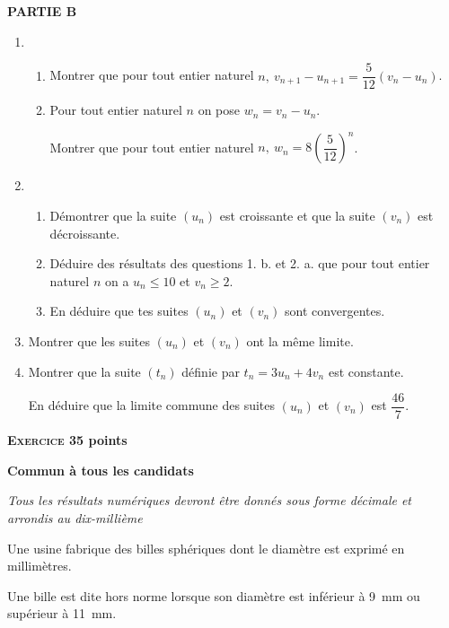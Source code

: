 \documentclass[10pt]{article}
\begin{document}
\textbf{PARTIE  B}

\medskip
 
\begin{enumerate}
\item 
	\begin{enumerate}
		\item Montrer que pour tout entier naturel $n,\: v_{n+1} - u_{n+1} = \dfrac{5}{12} \left(v_{n} - u_{n}\right)$. 
		\item Pour tout entier naturel $n$ on pose $w_{n} = v_{n} - u_{n}$.
		 
Montrer que pour tout entier naturel $n,\: w_{n} = 8 \left(\dfrac{5}{12} \right)^n$.
	\end{enumerate} 
\item 
	\begin{enumerate}
		\item Démontrer que la suite $\left(u_{n}\right)$ est croissante et que la suite $\left(v_{n}\right)$ est décroissante. 
		\item Déduire des résultats des questions 1. b. et 2. a. que pour tout entier naturel $n$ on a $u_{n} \leqslant 10$ et $v_{n} \geqslant 2$. 
		\item En déduire que tes suites $\left(u_{n}\right)$ et $\left(v_{n}\right)$ sont convergentes.
	\end{enumerate} 
\item Montrer que les suites $\left(u_{n}\right)$ et $\left(v_{n}\right)$ ont la même limite. 
\item Montrer que la suite $\left(t_{n}\right)$ définie par $t_{n} = 3u_{n} + 4v_{n}$ est constante. 

En déduire que la limite  commune des suites $\left(u_{n}\right)$ et $\left(v_{n}\right)$ est $\dfrac{46}{7}$. 
\end{enumerate}

\vspace{0,5cm}

\textbf{\textsc{Exercice 3}\hfill 5 points}

\textbf{Commun à tous les candidats}

\medskip
 
\emph{Tous les résultats numériques devront être donnés sous forme décimale et arrondis au dix-millième} 

\medskip

Une usine fabrique des billes sphériques dont le diamètre est exprimé en millimètres.
 
Une bille est dite hors norme lorsque son diamètre est inférieur à 9~mm ou supérieur à 11~mm.
\end{document}
